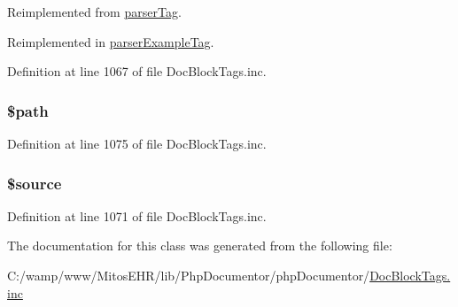 \-Reimplemented from \hyperlink{classparser_tag_a4a925d6b38bcf3957c713a7d3dc7da1f}{parser\-Tag}.



\-Reimplemented in \hyperlink{classparser_example_tag_a4a925d6b38bcf3957c713a7d3dc7da1f}{parser\-Example\-Tag}.



\-Definition at line 1067 of file \-Doc\-Block\-Tags.\-inc.

\hypertarget{classparser_file_source_tag_a0a4baf0b22973c07685c3981f0d17fc4}{
\subsubsection[{\$path}]{\setlength{\rightskip}{0pt plus 5cm}\$path}}\label{classparser_file_source_tag_a0a4baf0b22973c07685c3981f0d17fc4}


\-Definition at line 1075 of file \-Doc\-Block\-Tags.\-inc.

\hypertarget{classparser_file_source_tag_a99a2b085f0a29bd5d799fdcbb63d261b}{
\subsubsection[{\$source}]{\setlength{\rightskip}{0pt plus 5cm}\$source}}\label{classparser_file_source_tag_a99a2b085f0a29bd5d799fdcbb63d261b}


\-Definition at line 1071 of file \-Doc\-Block\-Tags.\-inc.



\-The documentation for this class was generated from the following file\-:\begin{DoxyCompactItemize}
\item 
\-C\-:/wamp/www/\-Mitos\-E\-H\-R/lib/\-Php\-Documentor/php\-Documentor/\hyperlink{_doc_block_tags_8inc}{\-Doc\-Block\-Tags.\-inc}\end{DoxyCompactItemize}
